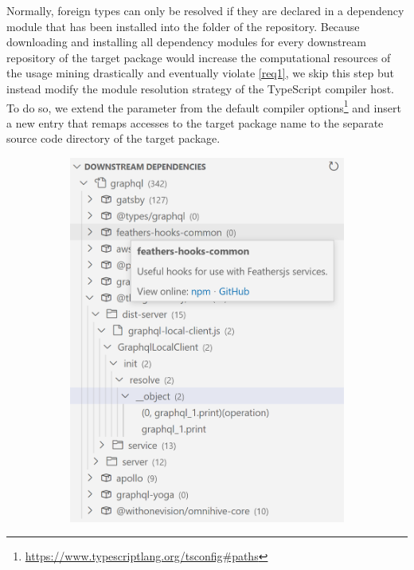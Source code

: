 Normally, foreign types can only be resolved if they are declared in a dependency module that has been installed into the  folder of the repository.
Because downloading and installing all dependency modules for every downstream repository of the target package would increase the computational resources of the usage mining drastically and eventually violate \cref{req1}, we skip this step but instead modify the module resolution strategy of the TypeScript compiler host.
To do so, we extend the  parameter from the default compiler options\footnote{\url{https://www.typescriptlang.org/tsconfig\#paths}} and insert a new entry that remaps accesses to the target package name to the separate source code directory of the target package.

\begin{figure}
	\centering
	\begin{subfigure}{.32\linewidth}
		\includegraphics[width=\linewidth]{sections/4_implementation/extension/dependencies.png}

\end{subfigure}
\end{figure}
